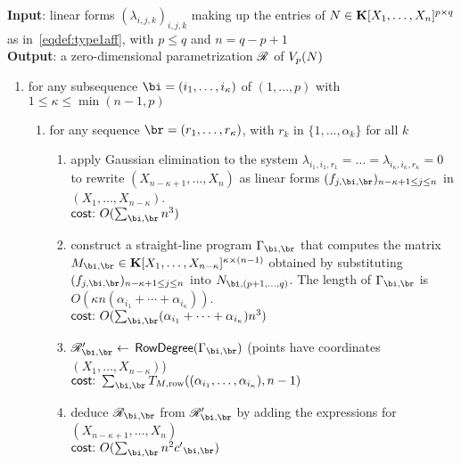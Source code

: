 \documentclass[12pt]{article}
\begin{document}
\begin{algorithm}[!t]
\caption{$\mathsf{RowDegreeDiagonal}((\lambda_{i,j,k})_{i,j,k})$}
{\bf Input}: linear forms $(\lambda_{i,j,k})_{i,j,k}$ making up 
the entries of 
${N} \in \mathbf{K}[X_1, \ldots, X_n]^{p \times q}$ as in~\eqref{eqdef:type1aff}, with $p \leq q$ and $n = q-p+1$\\
{\bf Output}: a zero-dimensional parametrization $\mathscr{R}$ of $V_p({N})$
\begin{enumerate}
\item for any subsequence $\bi = (i_1, \ldots, i_\kappa)$ of $(1, \ldots, p)$ with $1 \leq \kappa \leq\min(n-1,p)$
  \begin{enumerate}
  \item for any sequence $\br = (r_1, \ldots, r_\kappa)$, with $r_k$ in $\{1,\dots,\alpha_k\}$ for all $k$
    \begin{enumerate}
    \item apply Gaussian elimination to the system $\lambda_{i_1,i_1,r_1}=\dots=\lambda_{i_\kappa,i_\kappa,r_\kappa}=0$
      to rewrite $(X_{n-\kappa+1}, \ldots, X_n)$ as linear forms $(f_{j,\bi,\br})_{n-\kappa+1 \le j \le n}$ in $(X_1, \ldots, X_{n-\kappa})$. \\
$\text{\sf{cost:~}} O(\sum_{\bi,\br} n^3)$
    \item\label{step:constSLP} construct a straight-line program $\Gamma_{\bi,\br}$ that computes the matrix $\mM_{\bi,\br} \in \KK[X_1, \dots, X_{n-\kappa}]^{\kappa \times (n-1)}$ obtained
      by substituting $(f_{j,\bi,\br})_{n-\kappa+1 \le j \le n}$ into $\mN_{\bi,(p+1, \ldots, q)}$. The length of $\Gamma_{\bi,\br}$ is $O(\kappa n(\alpha_{i_1}+\cdots+\alpha_{i_\kappa}))$.\\
      $\text{\sf{cost:~}} O(\sum_{\bi,\br} (\alpha_{i_1} + \cdots + \alpha_{i_\kappa}) n^3)$
    \item $\scrR_{\bi,\br}' \gets$ $\mathsf{RowDegree}(\Gamma_{\bi,\br})$  (points have coordinates $(X_1, \ldots, X_{n-\kappa})$)\\
$\text{\sf{cost:~}} \sum_{\bi,\br} T_{M,{\rm row}}((\alpha_{i_1},\dots,\alpha_{i_\kappa}), n-1)$
    \item\label{step:substdiag} deduce $\scrR_{\bi,\br}$ from $\scrR_{\bi,\br}'$ by adding the expressions for $(X_{n-\kappa+1}, \ldots, X_n)$\\
      $\text{\sf{cost:~}} O(\sum_{\bi,\br} n^2 \rc_{\bi,\br})$
  \end{enumerate}
  \end{enumerate}


\end{enumerate}
\end{algorithm}
\end{document}

